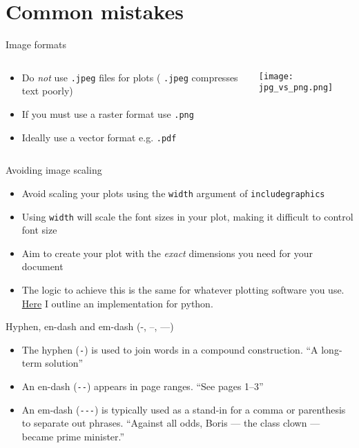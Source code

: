 \section{Common mistakes}

\begin{frame}{Image formats}
  \begin{columns}
    \begin{column}{0.5\textwidth}
      \begin{itemize}
        \item Do \emph{not} use \texttt{.jpeg} files for plots (
          \texttt{.jpeg} compresses text poorly)
        \item If you must use a raster format use \texttt{.png}
        \item Ideally use a vector format e.g. \texttt{.pdf}
      \end{itemize}
    \end{column}
    \begin{column}{0.5\textwidth}
      \texttt{[image: jpg\_vs\_png.png]}
    \end{column}
  \end{columns}
\end{frame}

\begin{frame}{Avoiding image scaling}
  \begin{itemize}
    \item Avoid scaling your plots using the \texttt{width} argument
      of \texttt{\tb includegraphics}
    \item Using \texttt{width} will scale the font sizes in your plot, making it
	  	difficult to control font size
	  \item Aim to create your plot with the \emph{exact} dimensions you need for
      your document
    \item The logic to achieve this is the same for whatever plotting software
      you use. \href{https://jwalton.info/Embed-Publication-Matplotlib-Latex/}%
      {Here} I outline an implementation for python.
  \end{itemize}
\end{frame}

\begin{frame}[fragile]{Hyphen, en-dash and em-dash (-, --, ---)}
  \begin{itemize}
    \item The \textcolor{mLightGreen}{hyphen} (\lstinline|-|) is used to join
      words in a compound construction. ``A long-term solution''
    \item An \textcolor{mLightGreen}{en-dash} (\lstinline|--|) appears in page
      ranges. ``See pages 1--3''
    \item An \textcolor{mLightGreen}{em-dash} (\lstinline|---|) is typically
      used as a stand-in for a comma or parenthesis to separate out phrases.
      ``Against all odds, Boris --- the class clown --- became prime minister.''
  \end{itemize}
\end{frame}

